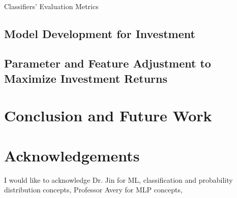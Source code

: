 \documentclass[twocolumn,10pt]{article}
\makeatletter
\newenvironment{tablehere}
  {\def\@captype{table}}
  {}
\makeatother
\begin{document}
\begin{multicols}{2}
\begin{flushleft}
	\mbox{}\\
	\begin{tablehere}
		\centering
		\caption{Classifiers' Evaluation Metrics}
		\label{tab:classevalmetrics}
	\end{tablehere}

	\subsection{Model Development for Investment} \label{investment_model_dev}
	
	\subsection{Parameter and Feature Adjustment to Maximize Investment Returns} \label{adjustment_models}
	
	
	
	\section{Conclusion and Future Work} \label{conclusion}
		
	
	\section{Acknowledgements} \label{acknowledgements}
	I would like to acknowledge Dr. Jin \cite{rjin} for ML, classification and probability distribution concepts, Professor Avery \cite{avery} for MLP concepts, 




\end{flushleft}
\end{multicols}
\end{document}
